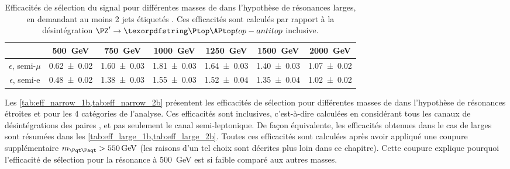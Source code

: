 \begin{table}[p!] \centering
  \begin{tabular}{ccccccc} \toprule
    & \SI{500}{\GeV} & \SI{750}{\GeV} & \SI{1000}{\GeV} & \SI{1250}{\GeV} & \SI{1500}{\GeV} & \SI{2000}{\GeV} \\ \midrule
    $\epsilon$, semi-$\mu$ & \num{0.62 \pm 0.02} & \num{1.60 \pm 0.03} & \num{1.81 \pm 0.03} & \num{1.64 \pm 0.03} & \num{1.40 \pm 0.03} & \num{1.07 \pm 0.02} \\
    $\epsilon$, semi-e & \num{0.48 \pm 0.02} & \num{1.38 \pm 0.03} & \num{1.55 \pm 0.03} & \num{1.52 \pm 0.04} & \num{1.35 \pm 0.04} & \num{1.02 \pm 0.02} \\ \bottomrule
  \end{tabular}
  \caption{Efficacités de sélection du signal pour différentes masses de \zprime dans l'hypothèse de résonances larges, en demandant au moins 2 jets étiquetés \Pbottom. Ces efficacités sont calculés par rapport à la désintégration $\zprime \rightarrow \ttbar$ inclusive.}
  \label{tab:eff_large_2b}
\end{table}

Les \cref{tab:eff_narrow_1b,tab:eff_narrow_2b} présentent les efficacités de sélection pour différentes masses de \zprime dans l'hypothèse de résonances étroites et pour les 4 catégories de l'analyse. Ces efficacités sont inclusives, c'est-à-dire calculées en considérant tous les canaux de désintégrations des paires \ttbar, et pas seulement le canal semi-leptonique. De façon équivalente, les efficacités obtenues dans le cas de \zprime larges sont résumées dans les \cref{tab:eff_large_1b,tab:eff_large_2b}. Toutes ces efficacités sont calculées après avoir appliqué une coupure supplémentaire $\mtt > \SI{550}{\GeV}$ (les raisons d'un tel choix sont décrites plus loin dans ce chapitre). Cette coupure explique pourquoi l'efficacité de sélection pour la résonance à \SI{500}{\GeV} est si faible comparé aux autres masses.

\bigskip

